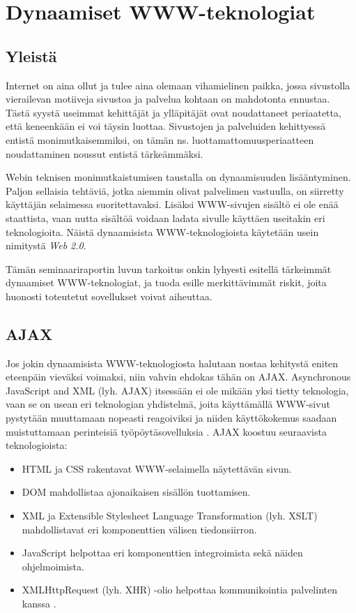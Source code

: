 
\ifdefined\seminaari
\relax
\else
\chapter{Dynaamiset WWW-teknologiat}
\fi

\section{Yleistä}

Internet on aina ollut ja tulee aina olemaan vihamielinen paikka, jossa sivustolla vierailevan motiiveja sivustoa ja palvelua kohtaan on mahdotonta ennustaa. Tästä syystä 
useimmat kehittäjät ja ylläpitäjät ovat noudattaneet periaatetta, että keneenkään ei voi täysin luottaa. Sivustojen ja palveluiden kehittyessä entistä monimutkaisemmiksi,
on tämän ns. luottamattomuusperiaatteen noudattaminen noussut entistä
tärkeämmäksi.

Webin teknisen monimutkaistumisen taustalla on dynaamisuuden
lisääntyminen. Paljon sellaisia tehtäviä, jotka aiemmin olivat
palvelimen vastuulla, on siirretty käyttäjän selaimessa
suoritettavaksi. Lisäksi WWW-sivujen sisältö ei ole enää staattista,
vaan uutta sisältöä voidaan ladata sivulle käyttäen useitakin eri
teknologioita. Näistä dynaamisista WWW-teknologioista käytetään
usein nimitystä \emph{Web 2.0}.

Tämän \ifdefined\seminaari seminaariraportin \else luvun \fi tarkoitus
onkin lyhyesti esitellä tärkeimmät dynaamiset WWW-teknologiat, ja
tuoda esille merkittävimmät riskit, joita huonosti toteutetut
sovellukset voivat aiheuttaa.

\section {AJAX}

Jos jokin dynaamisista WWW-teknologiosta halutaan nostaa kehitystä
eniten eteenpäin vieväksi voimaksi, niin vahvin ehdokas tähän on AJAX.
Asynchronous JavaScript and XML (lyh. AJAX) itsessään ei ole mikään
yksi tietty teknologia, vaan se on usean eri teknologian yhdistelmä,
joita käyttämällä WWW-sivut pystytään muuttamaan nopeasti reagoiviksi
ja niiden käyttökokemus saadaan muistuttamaan perinteisiä
työpöytäsovelluksia \cite{AJAX}. AJAX koostuu seuraavista
teknologioista:

\begin{itemize}
\item HTML ja CSS rakentavat WWW-selaimella näytettävän sivun.
\item DOM mahdollistaa ajonaikaisen sisällön tuottamisen.
\item XML ja Extensible Stylesheet Language Transformation (lyh. XSLT)
  mahdollistavat eri komponenttien välisen tiedonsiirron.
\item JavaScript helpottaa eri komponenttien integroimista sekä näiden
  ohjelmoimista.
\item XMLHttpRequest (lyh. XHR) -olio helpottaa kommunikointia
  palvelinten kanssa \cite{WEB2b}.
\end{itemize}

